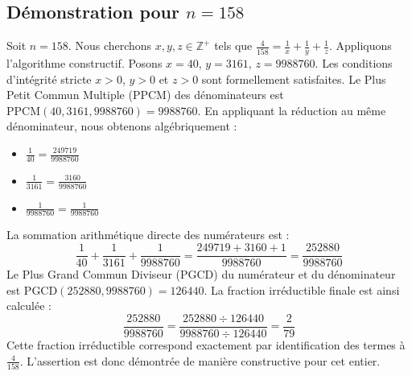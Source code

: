 \documentclass[11pt,a4paper]{article}
\begin{document}
\subsection{Démonstration pour $n = 158$}
Soit $n = 158$. Nous cherchons $x, y, z \in \mathbb{Z}^{+}$ tels que $\frac{4}{158} = \frac{1}{x} + \frac{1}{y} + \frac{1}{z}$.
Appliquons l'algorithme constructif. Posons $x = 40$, $y = 3161$, $z = 9988760$.
Les conditions d'intégrité stricte $x > 0$, $y > 0$ et $z > 0$ sont formellement satisfaites.
Le Plus Petit Commun Multiple (PPCM) des dénominateurs est $\text{PPCM}(40, 3161, 9988760) = 9988760$.
En appliquant la réduction au même dénominateur, nous obtenons algébriquement :
\begin{itemize}
    \item $\frac{1}{40} = \frac{249719}{9988760}$
    \item $\frac{1}{3161} = \frac{3160}{9988760}$
    \item $\frac{1}{9988760} = \frac{1}{9988760}$
\end{itemize}
La sommation arithmétique directe des numérateurs est :
$$ \frac{1}{40} + \frac{1}{3161} + \frac{1}{9988760} = \frac{249719 + 3160 + 1}{9988760} = \frac{252880}{9988760} $$
Le Plus Grand Commun Diviseur (PGCD) du numérateur et du dénominateur est $\text{PGCD}(252880, 9988760) = 126440$.
La fraction irréductible finale est ainsi calculée :
$$ \frac{252880}{9988760} = \frac{252880 \div 126440}{9988760 \div 126440} = \frac{2}{79} $$
Cette fraction irréductible correspond exactement par identification des termes à $\frac{4}{158}$. L'assertion est donc démontrée de manière constructive pour cet entier.
\end{document}

